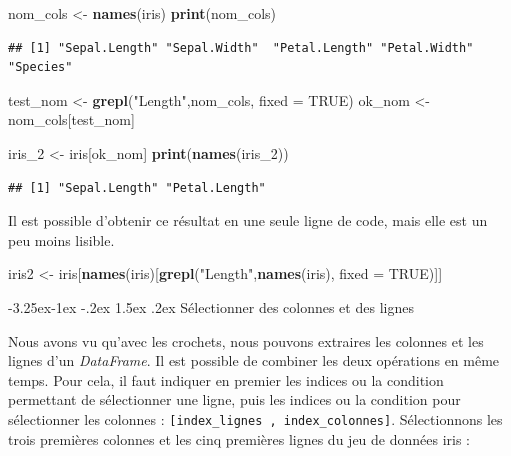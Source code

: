 \documentclass[
  11pt,
  french,
]{book}
\makeatletter
\newenvironment{Shaded}{\begin{snugshade}}{\end{snugshade}}
\newcommand{\DataTypeTok}[1]{\textcolor[rgb]{0.13,0.29,0.53}{#1}}
\newcommand{\DecValTok}[1]{\textcolor[rgb]{0.00,0.00,0.81}{#1}}
\newcommand{\KeywordTok}[1]{\textcolor[rgb]{0.13,0.29,0.53}{\textbf{#1}}}
\newcommand{\NormalTok}[1]{#1}
\newcommand{\OtherTok}[1]{\textcolor[rgb]{0.56,0.35,0.01}{#1}}
\newcommand{\StringTok}[1]{\textcolor[rgb]{0.31,0.60,0.02}{#1}}
\newenvironment{kframe}{%
\medskip{}
\setlength{\fboxsep}{.8em}
 \def\at@end@of@kframe{}%
 \ifinner\ifhmode%
  \def\at@end@of@kframe{\end{minipage}}%
  \begin{minipage}{\columnwidth}%
 \fi\fi%
 \def\FrameCommand##1{\hskip\@totalleftmargin \hskip-\fboxsep
 \colorbox{shadecolor}{##1}\hskip-\fboxsep
     \hskip-\linewidth \hskip-\@totalleftmargin \hskip\columnwidth}%
 \MakeFramed {\advance\hsize-\width
   \@totalleftmargin\z@ \linewidth\hsize
   \@setminipage}}%
 {\par\unskip\endMakeFramed%
 \at@end@of@kframe}
\renewenvironment{Shaded}{\begin{kframe}}{\end{kframe}}
\renewcommand\paragraph{\@startsection{paragraph}{4}{\z@}%
   {-3.25ex\@plus -1ex \@minus -.2ex}%
   {1.5ex \@plus .2ex}%
   {\normalfont\normalsize\bfseries}}
\makeatother
\begin{document}
\begin{Shaded}
\begin{Highlighting}[]
\NormalTok{nom_cols <-}\StringTok{ }\KeywordTok{names}\NormalTok{(iris)}
\KeywordTok{print}\NormalTok{(nom_cols)}
\end{Highlighting}
\end{Shaded}

\begin{verbatim}
## [1] "Sepal.Length" "Sepal.Width"  "Petal.Length" "Petal.Width"  "Species"
\end{verbatim}

\begin{Shaded}
\begin{Highlighting}[]
\NormalTok{test_nom <-}\StringTok{ }\KeywordTok{grepl}\NormalTok{(}\StringTok{"Length"}\NormalTok{,nom_cols, }\DataTypeTok{fixed =} \OtherTok{TRUE}\NormalTok{)}
\NormalTok{ok_nom <-}\StringTok{ }\NormalTok{nom_cols[test_nom]}

\NormalTok{iris_}\DecValTok{2}\NormalTok{ <-}\StringTok{ }\NormalTok{iris[ok_nom]}
\KeywordTok{print}\NormalTok{(}\KeywordTok{names}\NormalTok{(iris_}\DecValTok{2}\NormalTok{))}
\end{Highlighting}
\end{Shaded}

\begin{verbatim}
## [1] "Sepal.Length" "Petal.Length"
\end{verbatim}

Il est possible d'obtenir ce résultat en une seule ligne de code, mais elle est un peu moins lisible.

\begin{Shaded}
\begin{Highlighting}[]
\NormalTok{iris2 <-}\StringTok{ }\NormalTok{iris[}\KeywordTok{names}\NormalTok{(iris)[}\KeywordTok{grepl}\NormalTok{(}\StringTok{"Length"}\NormalTok{,}\KeywordTok{names}\NormalTok{(iris), }\DataTypeTok{fixed =} \OtherTok{TRUE}\NormalTok{)]]}
\end{Highlighting}
\end{Shaded}

\hypertarget{sect014283}{%
\paragraph{Sélectionner des colonnes et des lignes}\label{sect014283}}

Nous avons vu qu'avec les crochets, nous pouvons extraires les colonnes et les lignes d'un \emph{DataFrame}. Il est possible de combiner les deux opérations en même temps. Pour cela, il faut indiquer en premier les indices ou la condition permettant de sélectionner une ligne, puis les indices ou la condition pour sélectionner les colonnes : \texttt{{[}index\_lignes\ ,\ index\_colonnes{]}}. Sélectionnons les trois premières colonnes et les cinq premières lignes du jeu de données iris :
\end{document}
